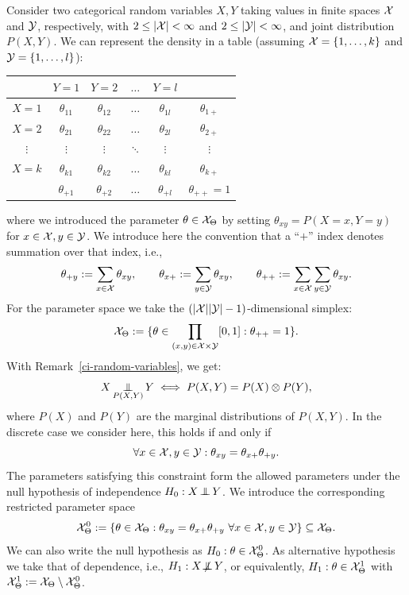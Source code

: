 Consider two categorical random variables $X,Y$ taking values in finite spaces $\mathcal{X}$ and $\mathcal{Y}$,
respectively, with $2 \le |\mathcal{X}| < \infty$ and $2 \le |\mathcal{Y}| < \infty$, and joint distribution $P(X,Y)$.
We can represent the density in a table (assuming $\mathcal{X} = \{1,\dots,k\}$ and $\mathcal{Y} = \{1,\dots,l\}$):
\begin{center}\begin{tabular}{c|cccc|c}
  & $Y=1$         & $Y=2$ & $\dots$ & $Y=l$ \\
  \hline
  $X=1$ & $\theta_{11}$      & $\theta_{12}$      & $\dots$ & $\theta_{1l}$ & $\theta_{1+}$\\
  $X=2$ & $\theta_{21}$      & $\theta_{22}$      & $\dots$ & $\theta_{2l}$ & $\theta_{2+}$\\
  $\vdots$ & $\vdots$     & $\vdots$       & $\ddots$ & $\vdots$  & $\vdots$ \\
  $X=k$ & $\theta_{k1}$      & $\theta_{k2}$      & $\dots$ & $\theta_{kl}$ & $\theta_{k+}$ \\
  \hline
  & $\theta_{+ 1}$ & $\theta_{+ 2}$ & $\dots$ & $\theta_{+ l}$ & $\theta_{++}=1$\\
\end{tabular}\end{center}
where we introduced the parameter $\theta \in \mathcal{X}_\Theta$ by setting $\theta_{xy} = P(X=x,Y=y)$ for
$x \in \mathcal{X}, y \in \mathcal{Y}$.
We introduce here the convention that a ``$+$'' index denotes summation over that index, i.e.,
$$\theta_{+ y} := \sum_{x\in\mathcal{X}} \theta_{xy}, \qquad \theta_{x+} := \sum_{y\in\mathcal{Y}} \theta_{xy}, \qquad \theta_{++} := \sum_{x\in\mathcal{X}}\sum_{y\in\mathcal{Y}} \theta_{xy}.$$
For the parameter space we take the $(|\mathcal{X}||\mathcal{Y}|-1)$-dimensional simplex:
$$\mathcal{X}_\Theta := \{ \theta \in \prod_{(x,y)\in\mathcal{X}\times\mathcal{Y}} [0,1] : \theta_{+ +} = 1 \}.$$
With Remark~\ref{ci-random-variables}, we get:
$$X \operatorname*{\perp\mkern-11mu\perp}_{P(X,Y)} Y \iff P(X,Y) = P(X) \otimes P(Y),$$
where $P(X)$ and $P(Y)$ are the marginal distributions of $P(X,Y)$.
In the discrete case we consider here, this holds if and only if
$$\forall x \in \mathcal{X}, y \in \mathcal{Y}: \theta_{xy} = \theta_{x+} \theta_{+ y}.$$
The parameters satisfying this constraint form the allowed parameters under the
null hypothesis of independence $H_0 : X \operatorname*{\perp\mkern-11mu\perp} Y$.
We introduce the corresponding restricted parameter space
$$\mathcal{X}_\Theta^0 := \{\theta \in \mathcal{X}_\Theta : \theta_{xy} = \theta_{x+} \theta_{+ y} \ \forall x\in\mathcal{X},y\in\mathcal{Y} \} \subseteq \mathcal{X}_\Theta.$$
We can also write the null hypothesis as $H_0 : \theta \in \mathcal{X}_\Theta^0$.
As alternative hypothesis we take that of dependence, i.e., $H_1 : X \operatorname*{\not\mkern-2mu\perp\mkern-11mu\perp} Y$, or equivalently,
$H_1 : \theta \in \mathcal{X}_\Theta^1$ with $\mathcal{X}_\Theta^1 := \mathcal{X}_\Theta \setminus \mathcal{X}_\Theta^0$.

